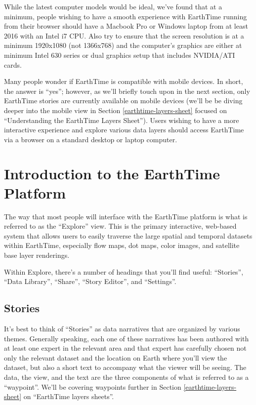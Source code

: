 \documentclass[
]{krantz}
\begin{document}
While the latest computer models would be ideal, we've found that at a minimum, people wishing to have a smooth experience with EarthTime running from their browser should have a Macbook Pro or Windows laptop from at least 2016 with an Intel i7 CPU. Also try to ensure that the screen resolution is at a minimum 1920x1080 (not 1366x768) and the computer's graphics are either at minimum Intel 630 series or dual graphics setup that includes NVIDIA/ATI cards.

Many people wonder if EarthTime is compatible with mobile devices. In short, the answer is ``yes''; however, as we'll briefly touch upon in the next section, only EarthTime stories are currently available on mobile devices (we'll be be diving deeper into the mobile view in Section \ref{earthtime-layers-sheet} focused on ``Understanding the EarthTime Layers Sheet''). Users wishing to have a more interactive experience and explore various data layers should access EarthTime via a browser on a standard desktop or laptop computer.

\hypertarget{introduction-to-the-earthtime-platform}{%
\section{Introduction to the EarthTime Platform}\label{introduction-to-the-earthtime-platform}}

The way that most people will interface with the EarthTime platform is what is referred to as the ``Explore'' view. This is the primary interactive, web-based system that allows users to easily traverse the large spatial and temporal datasets within EarthTime, especially flow maps, dot maps, color images, and satellite base layer renderings.

Within Explore, there's a number of headings that you'll find useful: ``Stories'', ``Data Library'', ``Share'', ``Story Editor'', and ``Settings''.

\hypertarget{stories}{%
\subsection*{Stories}\label{stories}}


It's best to think of ``Stories'' as data narratives that are organized by various themes. Generally speaking, each one of these narratives has been authored with at least one expert in the relevant area and that expert has carefully chosen not only the relevant dataset and the location on Earth where you'll view the dataset, but also a short text to accompany what the viewer will be seeing. The data, the view, and the text are the three components of what is referred to as a ``waypoint''. We'll be covering waypoints further in Section \ref{earthtime-layers-sheet} on ``EarthTime layers sheets''.
\end{document}
